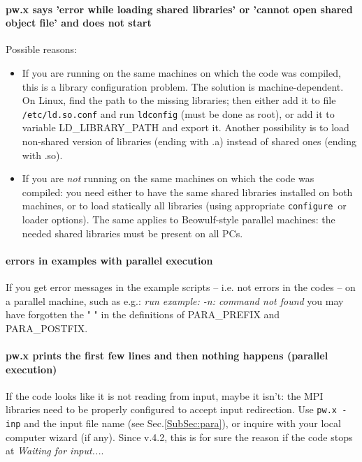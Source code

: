 \documentclass[12pt,a4paper]{article}
\def\configure{\texttt{configure}}
\begin{document}
\paragraph{pw.x says 'error while loading shared libraries' or
  'cannot open shared object file' and does not start} 
Possible reasons:
\begin{itemize}
\item If you are running on the same machines on which the code was
  compiled, this is a library configuration problem. The solution is
  machine-dependent. On Linux, find the path to the missing libraries;
  then either add it to file \texttt{/etc/ld.so.conf} and run \texttt{ldconfig}
   (must be
  done as root), or add it to variable LD\_LIBRARY\_PATH and export
  it. Another possibility is to load non-shared version of libraries
  (ending with .a)  instead of shared ones (ending with .so). 
\item If you are {\em not} running on the same machines on which the
  code was compiled: you need either to have the same shared libraries
  installed on both machines, or to load statically all libraries
  (using appropriate \configure\ or loader options). The same applies to
  Beowulf-style parallel machines: the needed shared libraries must be
  present on all PCs. 
\end{itemize}

\paragraph{errors in examples with parallel execution}

If you get error messages in the example scripts -- i.e. not errors in
the codes -- on a parallel machine, such as e.g.: 
{\em run example: -n: command not found}
you may have forgotten 
the " " in the definitions of PARA\_PREFIX and PARA\_POSTFIX.

\paragraph{pw.x prints the first few lines and then nothing happens
  (parallel execution)} 
If the code looks like it is not reading from input, maybe
it isn't: the MPI libraries need to be properly configured to accept input
redirection. Use \texttt{pw.x -inp} and the input file name (see Sec.\ref{SubSec:para}), or inquire with
your local computer wizard (if any). Since v.4.2, this is for sure the
reason if the code stops at {\em Waiting for input...}.
\end{document}
